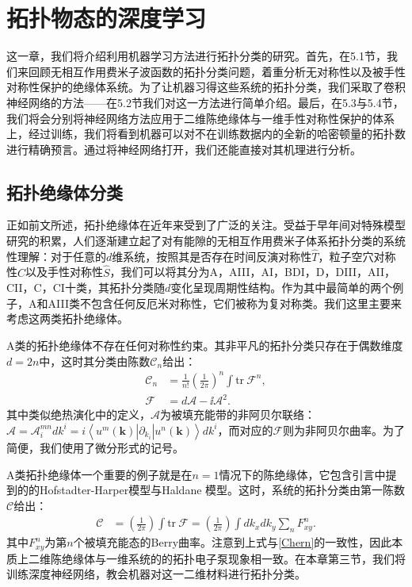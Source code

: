 \chapter{拓扑物态的深度学习} \label{sec:topoml}

这一章，我们将介绍利用机器学习方法进行拓扑分类的研究。首先，在5.1节，我们来回顾无相互作用费米子波函数的拓扑分类问题，着重分析无对称性以及被手性对称性保护的绝缘体系统。为了让机器习得这些系统的拓扑分类，我们采取了卷积神经网络的方法——在5.2节我们对这一方法进行简单介绍。最后，在5.3与5.4节，我们将会分别将神经网络方法应用于二维陈绝缘体与一维手性对称性保护的体系上，经过训练，我们将看到机器可以对不在训练数据内的全新的哈密顿量的拓扑数进行精确预言。通过将神经网络打开，我们还能直接对其机理进行分析。


\section{拓扑绝缘体分类}
正如前文所述，拓扑绝缘体在近年来受到了广泛的关注。受益于早年间对特殊模型研究的积累，人们逐渐建立起了对有能隙的无相互作用费米子体系拓扑分类\cite{topoclassify2016}的系统性理解：对于任意的$d$维系统，按照其是否存在时间反演对称性$\hat{T}$，粒子空穴对称性$\hat{C}$以及手性对称性$\hat{S}$，我们可以将其分为A，AIII，AI，BDI，D，DIII，AII，CII，C，CI十类，其拓扑分类随$d$变化呈现周期性结构。作为其中最简单的两个例子，A和AIII类不包含任何反厄米对称性，它们被称为复对称类。我们这里主要来考虑这两类拓扑绝缘体。

A类的拓扑绝缘体不存在任何对称性约束。其非平凡的拓扑分类只存在于偶数维度$d=2n$中，这时其分类由陈数$\mathcal{C}_n$给出：
\begin{align}
\mathcal{C}_n&=\frac{1}{n!}\left(\frac{1}{2\pi}\right)^n\int \text{tr}\ \mathcal{F}^n,\\
\mathcal{F}&=d\mathcal{A}-\ii \mathcal{A}^2.
\end{align}
其中类似绝热演化中的定义，$\mathcal{A}$为被填充能带的非阿贝尔联络：
$\mathcal{A}=\mathcal{A}_i^{m n}dk^i=i\left<u^m(\mathbf{k})|\partial_{k_i}|u^n(\mathbf{k})\right>dk^i$，而对应的$\mathcal{F}$则为非阿贝尔曲率。为了简便，我们使用了微分形式的记号。

A类拓扑绝缘体一个重要的例子就是在$n=1$情况下的陈绝缘体，它包含引言中提到的的Hofstadter-Harper模型与Haldane 模型。这时，系统的拓扑分类由第一陈数$\mathcal{C}$给出：
\begin{align}
\mathcal{C}&=\left(\frac{1}{2\pi}\right)\int \text{tr}\ \mathcal{F}=\left(\frac{1}{2\pi}\right)\int dk_x dk_y \sum_n F_{xy}^n.
\end{align}
其中$F^n_{xy}$为第$n$个被填充能态的Berry曲率。注意到上式与\eqref{Chern}的一致性，因此本质上二维陈绝缘体与一维系统的的拓扑电子泵现象相一致。在本章第三节，我们将训练深度神经网络，教会机器对这一二维材料进行拓扑分类。

